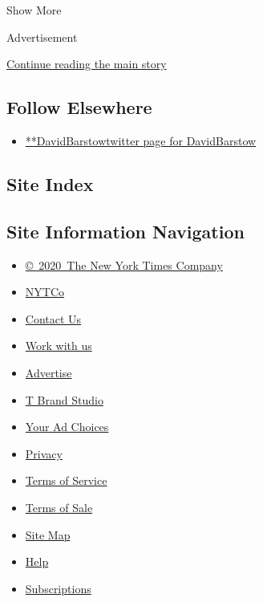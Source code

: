 Show More

Advertisement

\protect\hyperlink{after-mid2}{Continue reading the main story}

\hypertarget{follow-elsewhere}{%
\subsection{Follow Elsewhere}\label{follow-elsewhere}}

\begin{itemize}
\tightlist
\item
  \href{https://twitter.com/DavidBarstow}{**DavidBarstowtwitter page for
  DavidBarstow}
\end{itemize}

\hypertarget{site-index}{%
\subsection{Site Index}\label{site-index}}

\hypertarget{site-information-navigation}{%
\subsection{Site Information
Navigation}\label{site-information-navigation}}

\begin{itemize}
\tightlist
\item
  \href{https://help.nytimes3xbfgragh.onion/hc/en-us/articles/115014792127-Copyright-notice}{©~2020~The
  New York Times Company}
\end{itemize}

\begin{itemize}
\tightlist
\item
  \href{https://www.nytco.com/}{NYTCo}
\item
  \href{https://help.nytimes3xbfgragh.onion/hc/en-us/articles/115015385887-Contact-Us}{Contact
  Us}
\item
  \href{https://www.nytco.com/careers/}{Work with us}
\item
  \href{https://nytmediakit.com/}{Advertise}
\item
  \href{http://www.tbrandstudio.com/}{T Brand Studio}
\item
  \href{https://www.nytimes3xbfgragh.onion/privacy/cookie-policy\#how-do-i-manage-trackers}{Your
  Ad Choices}
\item
  \href{https://www.nytimes3xbfgragh.onion/privacy}{Privacy}
\item
  \href{https://help.nytimes3xbfgragh.onion/hc/en-us/articles/115014893428-Terms-of-service}{Terms
  of Service}
\item
  \href{https://help.nytimes3xbfgragh.onion/hc/en-us/articles/115014893968-Terms-of-sale}{Terms
  of Sale}
\item
  \href{https://spiderbites.nytimes3xbfgragh.onion}{Site Map}
\item
  \href{https://help.nytimes3xbfgragh.onion/hc/en-us}{Help}
\item
  \href{https://www.nytimes3xbfgragh.onion/subscription?campaignId=37WXW}{Subscriptions}
\end{itemize}
